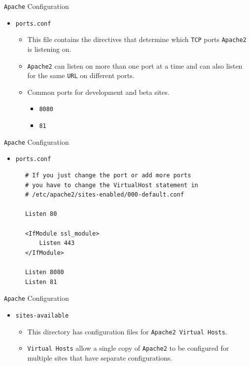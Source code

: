 \documentclass[xcolor=table,aspectratio=169]{beamer}
\begin{document}
\begin{frame}{\texttt{Apache} Configuration}
  \begin{itemize}
    \item \texttt{ports.conf} 
      \begin{itemize}
        \item This file contains the directives that determine which \texttt{TCP} ports \texttt{Apache2} is listening on.
        \item \texttt{Apache2} can listen on more than one port at a time and can also listen for the same \texttt{URL} on different ports.
        \item Common ports for development and beta sites.
          \begin{itemize}
            \item \texttt{8080}
            \item \texttt{81}
          \end{itemize}
      \end{itemize}
  \end{itemize}
\end{frame}

\begin{frame}[fragile]{\texttt{Apache} Configuration}
  \begin{itemize}
    \item \texttt{ports.conf}
  \end{itemize}
  \begin{tcolorbox}
    \lstset{
      basicstyle=\tiny\ttfamily,
    }
    \begin{lstlisting}
      # If you just change the port or add more ports 
      # you have to change the VirtualHost statement in
      # /etc/apache2/sites-enabled/000-default.conf

      Listen 80

      <IfModule ssl_module>
          Listen 443
      </IfModule>

      Listen 8080
      Listen 81
    \end{lstlisting}
  \end{tcolorbox}
\end{frame}

\begin{frame}{\texttt{Apache} Configuration}
  \begin{itemize}
    \item \texttt{sites-available} 
      \begin{itemize}
        \item This directory has configuration files for \texttt{Apache2 Virtual Hosts}. 
        \item \texttt{Virtual Hosts} allow a single copy of \texttt{Apache2} to be configured for multiple sites that have separate configurations.
      \end{itemize}
  \end{itemize}
\end{frame}
\end{document}
